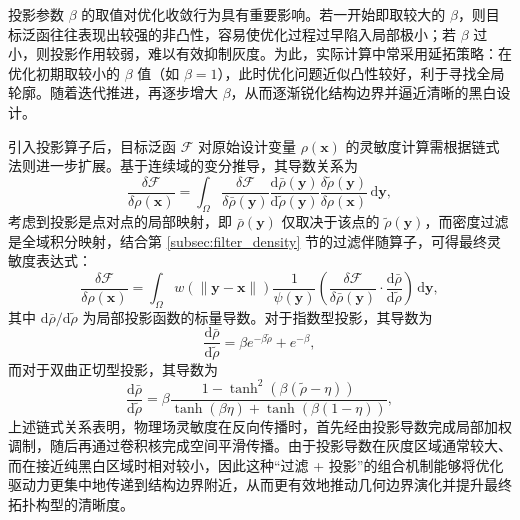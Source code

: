 投影参数 $\beta$ 的取值对优化收敛行为具有重要影响。若一开始即取较大的 $\beta$，则目标泛函往往表现出较强的非凸性，容易使优化过程过早陷入局部极小；若 $\beta$ 过小，则投影作用较弱，难以有效抑制灰度。为此，实际计算中常采用延拓策略：在优化初期取较小的 $\beta$ 值（如 $\beta=1$），此时优化问题近似凸性较好，利于寻找全局轮廓。随着迭代推进，再逐步增大 $\beta$，从而逐渐锐化结构边界并逼近清晰的黑白设计。

引入投影算子后，目标泛函 $\mathcal{F}$ 对原始设计变量 $\rho(\boldsymbol{x})$ 的灵敏度计算需根据链式法则进一步扩展。基于连续域的变分推导，其导数关系为
\[
\frac{\delta \mathcal{F}}{\delta \rho(\boldsymbol{x})} = \int_{\Omega} \frac{\delta \mathcal{F}}{\delta \bar{\rho}(\boldsymbol{y})} \frac{\mathrm{d} \bar{\rho}(\boldsymbol{y})}{\mathrm{d} \tilde{\rho}(\boldsymbol{y})} \frac{\delta \tilde{\rho}(\boldsymbol{y})}{\delta \rho(\boldsymbol{x})} \, \mathrm{d}\boldsymbol{y},
\]
考虑到投影是点对点的局部映射，即 $\bar{\rho}(\boldsymbol{y})$ 仅取决于该点的 $\tilde{\rho}(\boldsymbol{y})$，而密度过滤是全域积分映射，结合第 \ref{subsec:filter_density} 节的过滤伴随算子，可得最终灵敏度表达式：
\begin{equation} \label{eq:ch2_final_chain_rule}
	\frac{\delta \mathcal{F}}{\delta \rho(\boldsymbol{x})} = \int_{\Omega} w(\|\boldsymbol{y} - \boldsymbol{x}\|) \frac{1}{\psi(\boldsymbol{y})} \left( \frac{\delta \mathcal{F}}{\delta \bar{\rho}(\boldsymbol{y})} \cdot \frac{\mathrm{d} \bar{\rho}}{\mathrm{d} \tilde{\rho}} \right) \, \mathrm{d}\boldsymbol{y},
\end{equation}
其中 $\mathrm{d} \bar{\rho} / \mathrm{d} \tilde{\rho}$ 为局部投影函数的标量导数。对于指数型投影，其导数为
\[
\frac{\mathrm{d} \bar{\rho}}{\mathrm{d} \tilde{\rho}} = \beta e^{-\beta \tilde{\rho}} + e^{-\beta},
\]
而对于双曲正切型投影，其导数为
\[
\frac{\mathrm{d} \bar{\rho}}{\mathrm{d} \tilde{\rho}} = \beta \frac{1 - \tanh^2(\beta (\tilde{\rho} - \eta))}{\tanh(\beta \eta) + \tanh(\beta (1 - \eta))},
\]
上述链式关系表明，物理场灵敏度在反向传播时，首先经由投影导数完成局部加权调制，随后再通过卷积核完成空间平滑传播。由于投影导数在灰度区域通常较大、而在接近纯黑白区域时相对较小，因此这种“过滤 + 投影”的组合机制能够将优化驱动力更集中地传递到结构边界附近，从而更有效地推动几何边界演化并提升最终拓扑构型的清晰度。


